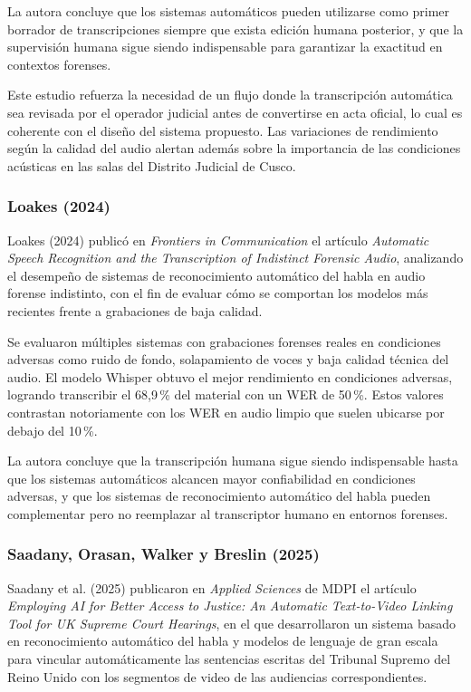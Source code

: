 \documentclass[12pt,a4paper,oneside]{article}
\begin{document}
La autora concluye que los sistemas autom\'aticos pueden utilizarse como primer borrador de transcripciones siempre que exista edici\'on humana posterior, y que la supervisi\'on humana sigue siendo indispensable para garantizar la exactitud en contextos forenses.

Este estudio refuerza la necesidad de un flujo donde la transcripci\'on autom\'atica sea revisada por el operador judicial antes de convertirse en acta oficial, lo cual es coherente con el dise\~no del sistema propuesto. Las variaciones de rendimiento seg\'un la calidad del audio alertan adem\'as sobre la importancia de las condiciones ac\'usticas en las salas del Distrito Judicial de Cusco.

\subsubsection{Loakes (2024)}

Loakes (2024) public\'o en \textit{Frontiers in Communication} el art\'iculo \textit{Automatic Speech Recognition and the Transcription of Indistinct Forensic Audio}, analizando el desempe\~no de sistemas de reconocimiento autom\'atico del habla en audio forense indistinto, con el fin de evaluar c\'omo se comportan los modelos m\'as recientes frente a grabaciones de baja calidad.

Se evaluaron m\'ultiples sistemas con grabaciones forenses reales en condiciones adversas como ruido de fondo, solapamiento de voces y baja calidad t\'ecnica del audio. El modelo Whisper obtuvo el mejor rendimiento en condiciones adversas, logrando transcribir el 68{,}9\,\% del material con un WER de 50\,\%. Estos valores contrastan notoriamente con los WER en audio limpio que suelen ubicarse por debajo del 10\,\%.

La autora concluye que la transcripci\'on humana sigue siendo indispensable hasta que los sistemas autom\'aticos alcancen mayor confiabilidad en condiciones adversas, y que los sistemas de reconocimiento autom\'atico del habla pueden complementar pero no reemplazar al transcriptor humano en entornos forenses.

\subsubsection{Saadany, Orasan, Walker y Breslin (2025)}

Saadany et al. (2025) publicaron en \textit{Applied Sciences} de MDPI el art\'iculo \textit{Employing AI for Better Access to Justice: An Automatic Text-to-Video Linking Tool for UK Supreme Court Hearings}, en el que desarrollaron un sistema basado en reconocimiento autom\'atico del habla y modelos de lenguaje de gran escala para vincular autom\'aticamente las sentencias escritas del Tribunal Supremo del Reino Unido con los segmentos de video de las audiencias correspondientes.
\end{document}
